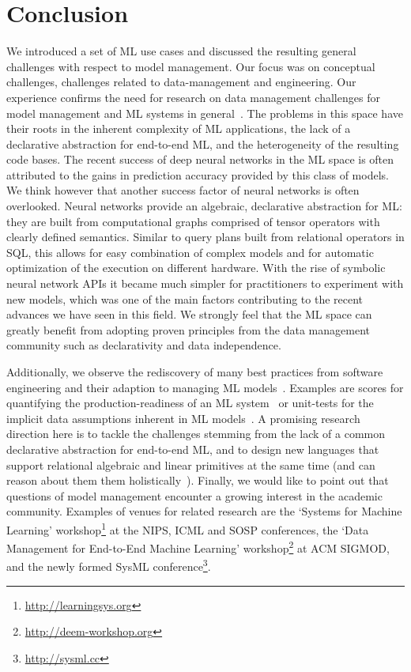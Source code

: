 \documentclass[11pt]{article}
\begin{document}
\section{Conclusion}

We introduced a set of ML use cases and discussed the resulting general challenges with respect to model management. Our focus was on conceptual challenges, challenges related to data-management and engineering. Our experience confirms the need for research on data management challenges for model management and ML systems in general~\cite{Sculley2015,Kumar2015}. The problems in this space have their roots in the inherent complexity of ML applications, the lack of a declarative abstraction for end-to-end ML, and the heterogeneity of the resulting code bases. The recent success of deep neural networks in the ML space is often attributed to the gains in prediction accuracy provided by this class of models. We think however that another success factor of neural networks is often overlooked. Neural networks provide an algebraic, declarative abstraction for ML: they are built from computational graphs comprised of tensor operators with clearly defined semantics. Similar to query plans built from relational operators in SQL, this allows for easy combination of complex models and for automatic optimization of the execution on different hardware. With the rise of symbolic neural network APIs it became much simpler for practitioners to experiment with new models, which was one of the main factors contributing to the recent advances we have seen in this field. We strongly feel that the ML space can greatly benefit from adopting proven principles from the data management community such as declarativity and data independence.

Additionally, we observe the rediscovery of many best practices from software engineering and their adaption to managing ML models~\cite{Zinkevich2017}. Examples are scores for quantifying the production-readiness of an ML system~\cite{Breck2016} or unit-tests for the implicit data assumptions inherent in ML models~\cite{Schelter2018}. A promising research direction here is to tackle the challenges stemming from the lack of a common declarative abstraction for end-to-end ML, and to design new languages that support relational algebraic and linear primitives at the same time (and can reason about them them holistically~\cite{Kunft2016,Kunft2017}). Finally, we would like to point out that questions of model management encounter a growing interest in the academic community. Examples of venues for related research are the `Systems for Machine Learning' workshop\footnote{\url{http://learningsys.org}} at the NIPS, ICML and SOSP conferences, the `Data Management for End-to-End Machine Learning' workshop\footnote{\url{http://deem-workshop.org}} at ACM SIGMOD, and the newly formed SysML conference\footnote{\url{http://sysml.cc}}.
\end{document}
